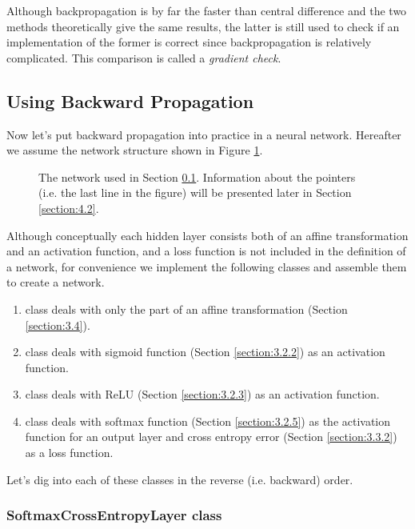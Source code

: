 \documentclass{article}
\theoremstyle{definition}
\newcommand{\sect}[1]{Section \ref{section:#1}}
\newcommand{\fig}[1]{Figure \ref{fig:#1}}
\begin{document}
Although backpropagation is by far the faster than central difference and the two methods theoretically give the same results, the latter is still used to check if an implementation of the former is correct since backpropagation is relatively complicated. This comparison is called a {\it gradient check}.

\subsection{Using Backward Propagation} \label{section:3.7}

Now let's put backward propagation into practice in a neural network. Hereafter we assume the network structure shown in \fig{3.6}.

\begin{figure}[H]
    \centering
    \begin{subfigure}[H]{1.0\textwidth}
	\end{subfigure}
    \caption{The network used in \sect{3.7}. Information about the pointers (i.e. the last line in the figure) will be presented later in \sect{4.2}.}
    \label{fig:3.6}
\end{figure}

Although conceptually each hidden layer consists both of an affine transformation and an activation function, and a loss function is not included in the definition of a network, for convenience we implement the following classes and assemble them to create a network.
\begin{enumerate}
\item
{} class deals with only the part of an affine transformation (\sect{3.4}).
\item
{} class deals with sigmoid function (\sect{3.2.2}) as an activation function.
\item
{} class deals with ReLU (\sect{3.2.3}) as an activation function.
\item
{} class deals with softmax function (\sect{3.2.5}) as the activation function for an output layer and cross entropy error (\sect{3.3.2}) as a loss function.
\end{enumerate}

Let's dig into each of these classes in the reverse (i.e. backward) order.

\subsubsection{SoftmaxCrossEntropyLayer class}
\end{document}
